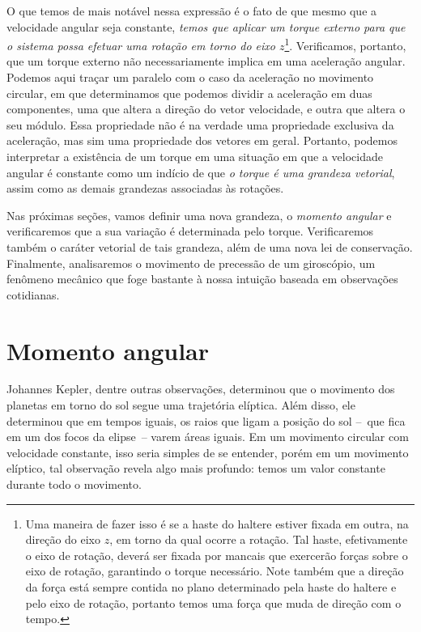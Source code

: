 O que temos de mais notável nessa expressão é o fato de que mesmo que a velocidade angular seja constante, \emph{temos que aplicar um torque externo para que o sistema possa efetuar uma rotação em torno do eixo $z$}\footnote{Uma maneira de fazer isso é se a haste do haltere estiver fixada em outra, na direção do eixo $z$, em torno da qual ocorre a rotação. Tal haste, efetivamente o eixo de rotação, deverá ser fixada por mancais que exercerão forças sobre o eixo de rotação, garantindo o torque necessário. Note também que a direção da força está sempre contida no plano determinado pela haste do haltere e pelo eixo de rotação, portanto temos uma força que muda de direção com o tempo.}. Verificamos, portanto, que um torque externo não necessariamente implica em uma aceleração angular. Podemos aqui traçar um paralelo com o caso da aceleração no movimento circular, em que determinamos que podemos dividir a aceleração em duas componentes, uma que altera a direção do vetor velocidade, e outra que altera o seu módulo. Essa propriedade não é na verdade uma propriedade exclusiva da aceleração, mas sim uma propriedade dos vetores em geral. Portanto, podemos interpretar a existência de um torque em uma situação em que a velocidade angular é constante como um indício de que \emph{o torque é uma grandeza vetorial}, assim como as demais grandezas associadas às rotações.

Nas próximas seções, vamos definir uma nova grandeza, o \emph{momento angular} e verificaremos que a sua variação é determinada pelo torque. Verificaremos também o caráter vetorial de tais grandeza, além de uma nova lei de conservação. Finalmente, analisaremos o movimento de precessão de um giroscópio, um fenômeno mecânico que foge bastante à nossa intuição baseada em observações cotidianas.

\section{Momento angular}

Johannes Kepler, dentre outras observações, determinou que o movimento dos planetas em torno do sol segue uma trajetória elíptica. Além disso, ele determinou que em tempos iguais, os raios que ligam a posição do sol --~que fica em um dos focos da elipse~-- varem áreas iguais. Em um movimento circular com velocidade constante, isso seria simples de se entender, porém em um movimento elíptico, tal observação revela algo mais profundo: temos um valor constante durante todo o movimento.

